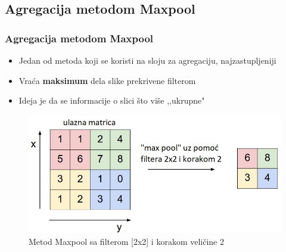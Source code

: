 \documentclass{beamer}
\begin{document}
\subsection{Agregacija metodom Maxpool}
\begin{frame}
\frametitle{Agregacija metodom Maxpool}

\begin{itemize}
\item Jedan od metoda koji se koristi na sloju za agregaciju, najzastupljeniji
\item Vraća \textbf{maksimum} dela slike prekrivene filterom 
\item Ideja je da se informacije o slici što više ,,ukrupne"
\end{itemize}

\begin{figure}
\includegraphics[scale=0.5]{maxpool.jpeg}
\caption{Metod Maxpool sa filterom [2x2] i korakom veličine 2}
\end{figure}

\end{frame}


\end{document}
